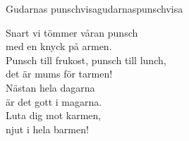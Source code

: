 \begin{song}{Gudarnas punschvisa}{gudarnaspunschvisa}
\begin{vers}
Snart vi tömmer våran punsch\\
med en knyck på armen.\\
Punsch till frukost, punsch till lunch,\\
det är mums för tarmen!\\
Nästan hela dagarna\\
är det gott i magarna.\\
Luta dig mot karmen,\\
njut i hela barmen!\\
\end{vers}
\end{song}
